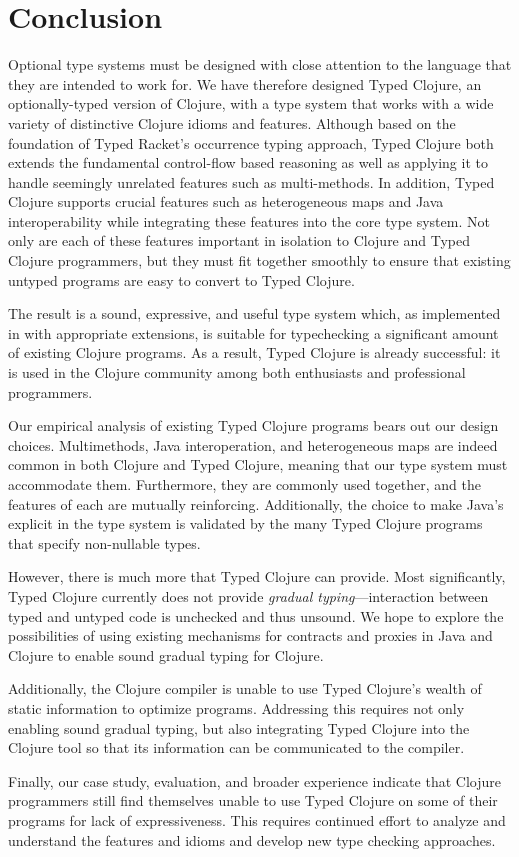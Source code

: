 \section{Conclusion}
\label{sec:conclusion}

Optional type systems must be designed with close attention to the
language that they are intended to work for.
We have therefore designed Typed Clojure, an optionally-typed version of
Clojure, with a type system that works with a wide variety of distinctive
Clojure idioms and features. Although based on the foundation of Typed
Racket's occurrence typing approach, Typed Clojure both extends the
fundamental control-flow based reasoning as well as applying it to
handle seemingly unrelated features such as multi-methods. In
addition, Typed Clojure supports crucial features such as
heterogeneous maps and Java interoperability while integrating these
features into the core type system. Not only are each of these
features important in isolation to Clojure and Typed Clojure
programmers, but they must fit together smoothly to ensure that
existing untyped programs are easy to convert to Typed Clojure.

The result is a sound, expressive, and useful type system which, as
implemented in \coretyped with appropriate extensions, is suitable for
typechecking a significant amount of existing Clojure programs.
%
As a result, Typed Clojure is already successful: it is used in
the Clojure community among both enthusiasts and professional
programmers.%

Our empirical analysis of existing Typed Clojure programs bears out
our design choices. Multimethods, Java interoperation, and
heterogeneous maps are indeed common in both Clojure and Typed Clojure,
meaning that our type system must accommodate them. Furthermore, they
are commonly used together, and the features of each are mutually
reinforcing. Additionally, the choice to make Java's 
explicit in the type system is validated by the many Typed Clojure
programs that  specify non-nullable types.


However, there is much more that Typed Clojure can provide. Most
significantly, Typed Clojure currently does not provide \emph{gradual
  typing}---interaction between typed and untyped code is unchecked and
thus unsound. We hope to explore the possibilities of using existing
mechanisms for contracts and proxies in Java and
Clojure to enable sound gradual typing for Clojure.

Additionally, the Clojure compiler is unable to use Typed Clojure's
wealth of static information to optimize programs. Addressing this
requires not only  enabling sound gradual typing, but also
integrating Typed Clojure into the Clojure tool so
that its information can be communicated to the compiler. 

Finally, our case study, evaluation, and broader experience indicate that Clojure
programmers still find themselves unable to use Typed Clojure on some
of their programs for lack of expressiveness. This requires continued
effort to analyze and understand the features and idioms and
develop new type checking approaches.
